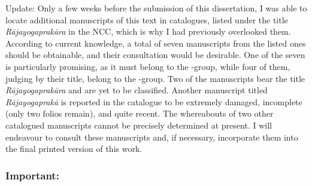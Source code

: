 Update: Only a few weeks before the submission of this dissertation, I was able to locate additional manuscripts of this text in catalogues, listed under the title \textit{Rājayogaprakāra} in the NCC, which is why I had previously overlooked them. According to current knowledge, a total of seven manuscripts from the listed ones should be obtainable, and their consultation would be desirable. One of the seven is particularly promising, as it must belong to the \alpha-group, while four of them, judging by their title, belong to the \beta-group. Two of the manuscripts bear the title \textit{Rājayogaprakāra} and are yet to be classified. Another manuscript titled \textit{Rājayogaprakā} is reported in the catalogue to be extremely damaged, incomplete (only two folios remain), and quite recent. The whereabouts of two other catalogued manuscripts cannot be precisely determined at present. I will endeavour to consult these manuscripts and, if necessary, incorporate them into the final printed version of this work.

\subsubsection{Important:}

